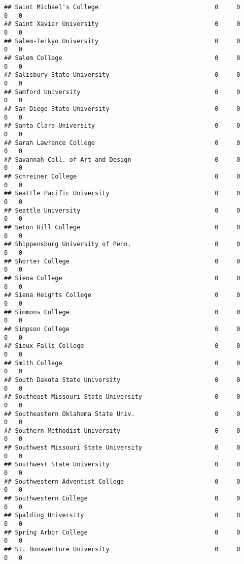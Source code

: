 \documentclass[
]{article}
\begin{document}
\begin{verbatim}
## Saint Michael's College                                0     0        0   0
## Saint Xavier University                                0     0        0   0
## Salem-Teikyo University                                0     0        0   0
## Salem College                                          0     0        0   0
## Salisbury State University                             0     0        0   0
## Samford University                                     0     0        0   0
## San Diego State University                             0     0        0   0
## Santa Clara University                                 0     0        0   0
## Sarah Lawrence College                                 0     0        0   0
## Savannah Coll. of Art and Design                       0     0        0   0
## Schreiner College                                      0     0        0   0
## Seattle Pacific University                             0     0        0   0
## Seattle University                                     0     0        0   0
## Seton Hill College                                     0     0        0   0
## Shippensburg University of Penn.                       0     0        0   0
## Shorter College                                        0     0        0   0
## Siena College                                          0     0        0   0
## Siena Heights College                                  0     0        0   0
## Simmons College                                        0     0        0   0
## Simpson College                                        0     0        0   0
## Sioux Falls College                                    0     0        0   0
## Smith College                                          0     0        0   0
## South Dakota State University                          0     0        0   0
## Southeast Missouri State University                    0     0        0   0
## Southeastern Oklahoma State Univ.                      0     0        0   0
## Southern Methodist University                          0     0        0   0
## Southwest Missouri State University                    0     0        0   0
## Southwest State University                             0     0        0   0
## Southwestern Adventist College                         0     0        0   0
## Southwestern College                                   0     0        0   0
## Spalding University                                    0     0        0   0
## Spring Arbor College                                   0     0        0   0
## St. Bonaventure University                             0     0        0   0

\end{verbatim}
\end{document}
